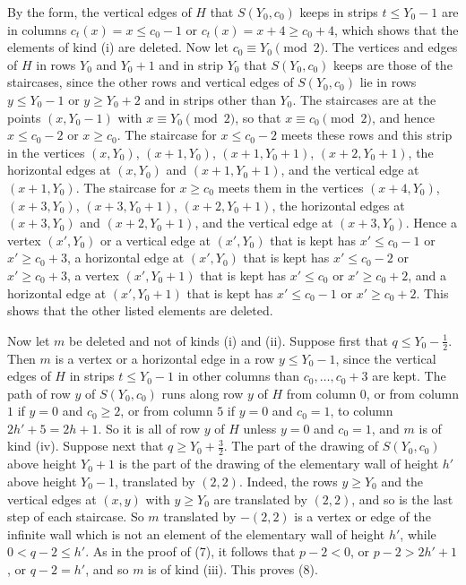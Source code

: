 {By the form, the vertical edges of $H$ that $S(Y_0, c_0)$ keeps in strips $t \le Y_0 - 1$ are in columns $c_t(x) = x \le c_0 - 1$ or $c_t(x) = x + 4 \ge c_0 + 4$, which shows that the elements of kind (i) are deleted. Now let $c_0 \equiv Y_0 \pmod 2$. The vertices and edges of $H$ in rows $Y_0$ and $Y_0 + 1$ and in strip $Y_0$ that $S(Y_0, c_0)$ keeps are those of the staircases, since the other rows and vertical edges of $S(Y_0, c_0)$ lie in rows $y \le Y_0 - 1$ or $y \ge Y_0 + 2$ and in strips other than $Y_0$. The staircases are at the points $(x, Y_0 - 1)$ with $x \equiv Y_0 \pmod 2$, so that $x \equiv c_0 \pmod 2$, and hence $x \le c_0 - 2$ or $x \ge c_0$. The staircase for $x \le c_0 - 2$ meets these rows and this strip in the vertices $(x, Y_0)$, $(x + 1, Y_0)$, $(x + 1, Y_0 + 1)$, $(x + 2, Y_0 + 1)$, the horizontal edges at $(x, Y_0)$ and $(x + 1, Y_0 + 1)$, and the vertical edge at $(x + 1, Y_0)$. The staircase for $x \ge c_0$ meets them in the vertices $(x + 4, Y_0)$, $(x + 3, Y_0)$, $(x + 3, Y_0 + 1)$, $(x + 2, Y_0 + 1)$, the horizontal edges at $(x + 3, Y_0)$ and $(x + 2, Y_0 + 1)$, and the vertical edge at $(x + 3, Y_0)$. Hence a vertex $(x', Y_0)$ or a vertical edge at $(x', Y_0)$ that is kept has $x' \le c_0 - 1$ or $x' \ge c_0 + 3$, a horizontal edge at $(x', Y_0)$ that is kept has $x' \le c_0 - 2$ or $x' \ge c_0 + 3$, a vertex $(x', Y_0 + 1)$ that is kept has $x' \le c_0$ or $x' \ge c_0 + 2$, and a horizontal edge at $(x', Y_0 + 1)$ that is kept has $x' \le c_0 - 1$ or $x' \ge c_0 + 2$. This shows that the other listed elements are deleted.

Now let $m$ be deleted and not of kinds (i) and (ii). Suppose first that $q \le Y_0 - \frac{1}{2}$. Then $m$ is a vertex or a horizontal edge in a row $y \le Y_0 - 1$, since the vertical edges of $H$ in strips $t \le Y_0 - 1$ in other columns than $c_0, \dots, c_0 + 3$ are kept. The path of row $y$ of $S(Y_0, c_0)$ runs along row $y$ of $H$ from column $0$, or from column $1$ if $y = 0$ and $c_0 \ge 2$, or from column $5$ if $y = 0$ and $c_0 = 1$, to column $2h' + 5 = 2h + 1$. So it is all of row $y$ of $H$ unless $y = 0$ and $c_0 = 1$, and $m$ is of kind (iv). Suppose next that $q \ge Y_0 + \frac{3}{2}$. The part of the drawing of $S(Y_0, c_0)$ above height $Y_0 + 1$ is the part of the drawing of the elementary wall of height $h'$ above height $Y_0 - 1$, translated by $(2, 2)$. Indeed, the rows $y \ge Y_0$ and the vertical edges at $(x, y)$ with $y \ge Y_0$ are translated by $(2, 2)$, and so is the last step of each staircase. So $m$ translated by $-(2, 2)$ is a vertex or edge of the infinite wall which is not an element of the elementary wall of height $h'$, while $0 < q - 2 \le h'$. As in the proof of (7), it follows that $p - 2 < 0$, or $p - 2 > 2h' + 1$, or $q - 2 = h'$, and so $m$ is of kind (iii). This proves (8).

}
